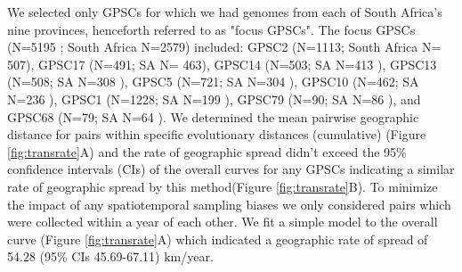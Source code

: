 \documentclass{article}
\begin{document}
We selected only GPSCs for which we had genomes from each of South Africa's nine provinces, henceforth referred to as "focus GPSCs". The focus GPSCs  (N=5195 ; South Africa N=2579) included: GPSC2 (N=1113; South Africa N= 507), GPSC17 (N=491; SA N= 463), GPSC14 (N=503; SA N=413 ), GPSC13 (N=508; SA N=308 ), GPSC5 (N=721; SA N=304 ), GPSC10 (N=462; SA N=236 ), GPSC1 (N=1228; SA N=199 ), GPSC79 (N=90; SA N=86 ),  and GPSC68 (N=79; SA N=64 ). We determined the mean pairwise geographic distance for pairs within specific evolutionary distances (cumulative) (Figure \ref{fig:transrate}A) and the rate of geographic spread didn't exceed the 95\% confidence intervals (CIs) of the overall curves for any GPSCs indicating a similar rate of geographic spread by this method(Figure \ref{fig:transrate}B). To minimize the impact of any spatiotemporal sampling biases we only considered pairs which were collected within a year of each other. We fit a simple model to the overall curve (Figure \ref{fig:transrate}A) which indicated a geographic rate of spread of 54.28 (95\% CIs  45.69-67.11) km/year. 
\end{document}
